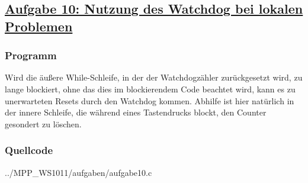 \subsection*
{\href{http://cst.mi.fu-berlin.de/intern/19606-P-MPP/Aufgaben/040302.html}
{Aufgabe 10: Nutzung des Watchdog bei lokalen Problemen}}

\subsubsection*{Programm}
Wird die äußere While-Schleife, in der der Watchdogzähler zurückgesetzt wird, zu lange
blockiert, ohne das dies im blockierendem Code beachtet wird, kann es zu unerwarteten
Resets durch den Watchdog kommen. Abhilfe ist hier natürlich in der innere Schleife, die
während eines Tastendrucks blockt, den Counter gesondert zu löschen.


\subsubsection*{Quellcode}

{../MPP_WS1011/aufgaben/aufgabe10.c}

\begin{comment}
Wie können Sie registrieren und speichern, wann und an welcher Programmstelle der Watchdog das System neu gestartet hat.

Skizzieren Sie einen Lösungsansatz. Als Hilfestellung hier folgende Stichwörter:

    NMI-Interrupt
    Stackpointer
    Programcounter
    Softwarereset
    INFOMEM
\end{comment}
